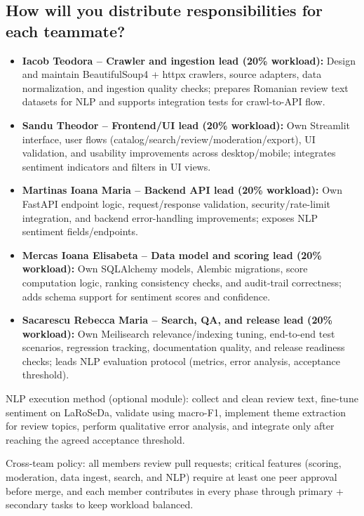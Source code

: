 \documentclass[12pt,a4paper]{article}
\begin{document}
\subsection{How will you distribute responsibilities for each teammate?}
\begin{itemize}[leftmargin=*]
	\item \textbf{Iacob Teodora -- Crawler and ingestion lead (20\% workload):}
	Design and maintain BeautifulSoup4 + httpx crawlers, source adapters, data normalization, and ingestion quality checks; prepares Romanian review text datasets for NLP and supports integration tests for crawl-to-API flow.

	\item \textbf{Sandu Theodor -- Frontend/UI lead (20\% workload):}
	Own Streamlit interface, user flows (catalog/search/review/moderation/export), UI validation, and usability improvements across desktop/mobile; integrates sentiment indicators and filters in UI views.

	\item \textbf{Martinas Ioana Maria -- Backend API lead (20\% workload):}
	Own FastAPI endpoint logic, request/response validation, security/rate-limit integration, and backend error-handling improvements; exposes NLP sentiment fields/endpoints.

	\item \textbf{Mercas Ioana Elisabeta -- Data model and scoring lead (20\% workload):}
	Own SQLAlchemy models, Alembic migrations, score computation logic, ranking consistency checks, and audit-trail correctness; adds schema support for sentiment scores and confidence.

	\item \textbf{Sacarescu Rebecca Maria -- Search, QA, and release lead (20\% workload):}
	Own Meilisearch relevance/indexing tuning, end-to-end test scenarios, regression tracking, documentation quality, and release readiness checks; leads NLP evaluation protocol (metrics, error analysis, acceptance threshold).
\end{itemize}
NLP execution method (optional module): collect and clean review text, fine-tune sentiment on LaRoSeDa, validate using macro-F1, implement theme extraction for review topics, perform qualitative error analysis, and integrate only after reaching the agreed acceptance threshold.

Cross-team policy: all members review pull requests; critical features (scoring, moderation, data ingest, search, and NLP) require at least one peer approval before merge, and each member contributes in every phase through primary + secondary tasks to keep workload balanced.
\end{document}
